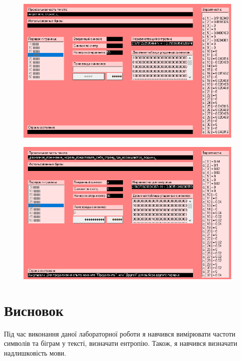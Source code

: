\begin{figure}[h!]
\centering
\includegraphics[width=.98\textwidth]{pics/pink2.png}

\label{fig:overleaf}
\end{figure}

\begin{figure}[h!]
\centering
\includegraphics[width=.98\textwidth]{pics/pink3.png}

\label{fig:overleaf}
\end{figure}


\section{Висновок}
Під час виконання даної лабораторної роботи я навчився вимірювати частоти символів та
біграм у тексті, визначати ентропію. Також, я навчився визначати надлишковість мови.